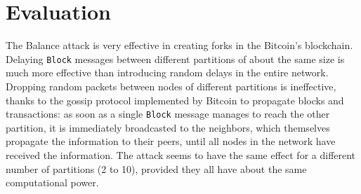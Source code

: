 \section{Evaluation}
The Balance attack is very effective in creating forks in the Bitcoin's blockchain.
Delaying \texttt{Block} messages between different partitions of about the same size is much more effective than introducing random delays in the entire network.
Dropping random packets between nodes of different partitions is ineffective, thanks to the gossip protocol implemented by Bitcoin to propagate blocks and transactions:
as soon as a single \texttt{Block} message manages to reach the other partition, it is immediately broadcasted to the neighbors, which themselves propagate the information to their peers, until all nodes in the network have received the information.
The attack seems to have the same effect for a different number of partitions (\num{2} to \num{10}), provided they all have about the same computational power.
